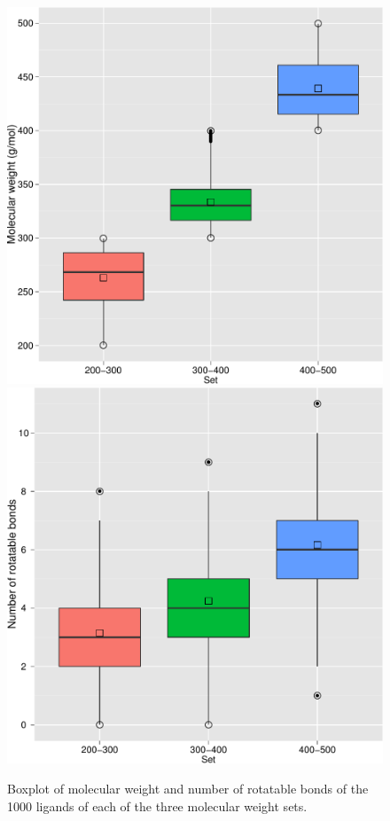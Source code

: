 \documentclass[12pt]{article}
\begin{document}
\begin{center}
\begin{figure}
\subfloat
{
  \includegraphics[width=0.485\linewidth]{MWT3.pdf}
}
\subfloat
{
  \includegraphics[width=0.485\linewidth]{NRB3.pdf}
}
\caption{\label{MWT-NRB} Boxplot of molecular weight and number of rotatable bonds of the 1000 ligands of each of the three molecular weight sets.}
\end{figure}
\end{center}

\clearpage
\end{document}
